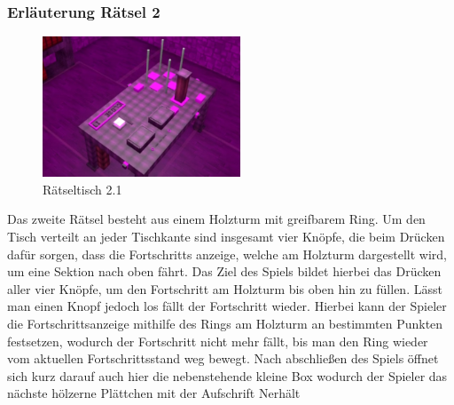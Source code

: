 \subsubsection{Erläuterung Rätsel 2}
\begin{figure}
	\vspace*{-1cm}
	\includegraphics[width=5.9cm]{Pictures/Tisch2}
	\caption{Rätseltisch 2.1}
	\vspace*{0cm}
	\label{fig:tisch2}
\end{figure}
Das zweite Rätsel besteht aus einem Holzturm mit greifbarem Ring. Um den Tisch verteilt an jeder Tischkante sind insgesamt vier Knöpfe, die beim Drücken dafür sorgen, dass die Fortschritts anzeige, welche am Holzturm dargestellt wird, um eine Sektion nach oben fährt. Das Ziel des Spiels bildet hierbei das Drücken aller vier Knöpfe, um den Fortschritt am Holzturm bis oben hin zu füllen. Lässt man einen Knopf jedoch los fällt der Fortschritt wieder. Hierbei kann der Spieler die Fortschrittsanzeige mithilfe des Rings am Holzturm an bestimmten Punkten festsetzen, wodurch der Fortschritt nicht mehr fällt, bis man den Ring wieder vom aktuellen Fortschrittsstand weg bewegt. Nach abschließen des Spiels öffnet sich kurz darauf auch hier die nebenstehende kleine Box wodurch der Spieler das nächste hölzerne Plättchen mit der Aufschrift \dq N\dq erhält\\
\newpage

